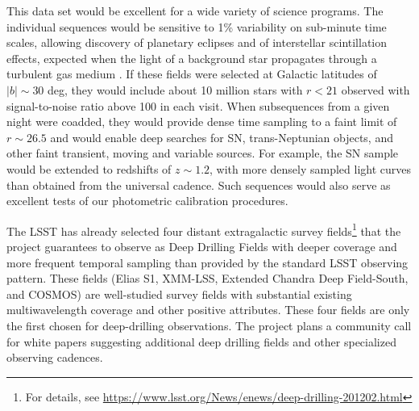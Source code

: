 This data set would be excellent for a wide variety of science programs. The
individual sequences would be sensitive to 1\% variability on sub-minute time
scales, allowing discovery of planetary eclipses and of interstellar scintillation
effects, expected when the light of a background star propagates through a
turbulent gas medium \citep{2003A&A...412..105M, 2011A&A...525A.108H}.
If these fields were selected
at Galactic latitudes of $|b|\sim30$ deg, they would include about 10 million
stars with $r<21$ observed with signal-to-noise ratio above 100 in each visit.
When subsequences from a given night were coadded, they would
provide dense time sampling to a faint limit of $r\sim26.5$
and would enable deep searches
for SN, trans-Neptunian objects, and other faint transient, moving and
variable sources.  For example, the SN sample
would be extended to redshifts of $z\sim1.2$, with more densely sampled light
curves than obtained from the universal cadence. Such sequences would also
serve as excellent tests of our photometric calibration procedures.

The LSST has already selected four distant extragalactic survey fields\footnote{For
details, see \url{https://www.lsst.org/News/enews/deep-drilling-201202.html}}
that the project guarantees to observe as Deep Drilling Fields with deeper coverage
and more frequent temporal sampling than provided by the standard LSST observing
pattern. These fields (Elias S1, XMM-LSS, Extended Chandra Deep Field-South, and
COSMOS) are  well-studied survey fields with substantial existing multiwavelength
coverage and other positive attributes. These four fields are only the first chosen
for deep-drilling observations.  The project plans a community call
for white papers suggesting additional deep drilling fields and other
specialized observing cadences.


